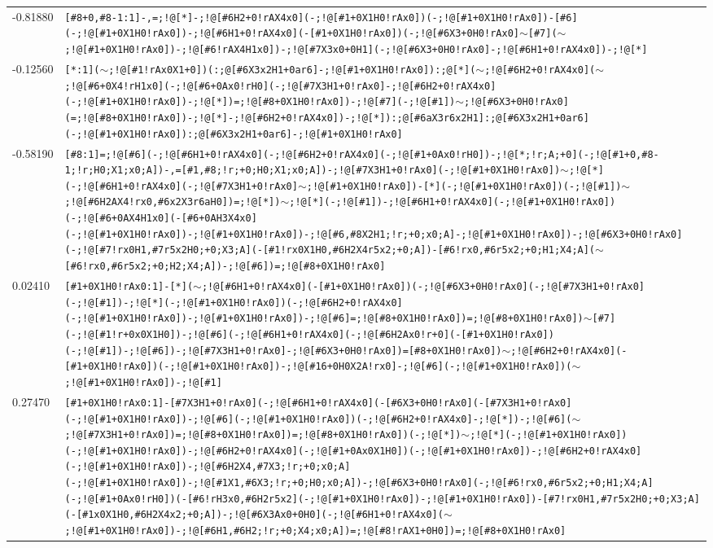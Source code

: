 \begin{longtable}{>{\baselineskip=10pt}p{} >{\baselineskip=10pt}p{}}
-0.81880 & \texttt{[\#8+0,\#8-1:1]-,=;!@[*]-;!@[\#6H2+0!rAX4x0](-;!@[\#1+0X1H0!rAx0])(-;!@[\#1+0X1H0!rAx0])-[\#6](-;!@[\#1+0X1H0!rAx0])-;!@[\#6H1+0!rAX4x0](-[\#1+0X1H0!rAx0])(-;!@[\#6X3+0H0!rAx0]$\sim$[\#7]($\sim$;!@[\#1+0X1H0!rAx0])-;!@[\#6!rAX4H1x0])-;!@[\#7X3x0+0H1](-;!@[\#6X3+0H0!rAx0]-;!@[\#6H1+0!rAX4x0])-;!@[*]} \\ 
-0.12560 & \texttt{[*:1]($\sim$;!@[\#1!rAx0X1+0])(:;@[\#6X3x2H1+0ar6]-;!@[\#1+0X1H0!rAx0]):;@[*]($\sim$;!@[\#6H2+0!rAX4x0]($\sim$;!@[\#6+0X4!rH1x0](-;!@[\#6+0Ax0!rH0](-;!@[\#7X3H1+0!rAx0]-;!@[\#6H2+0!rAX4x0](-;!@[\#1+0X1H0!rAx0])-;!@[*])=;!@[\#8+0X1H0!rAx0])-;!@[\#7](-;!@[\#1])$\sim$;!@[\#6X3+0H0!rAx0](=;!@[\#8+0X1H0!rAx0])-;!@[*]-;!@[\#6H2+0!rAX4x0])-;!@[*]):;@[\#6aX3r6x2H1]:;@[\#6X3x2H1+0ar6](-;!@[\#1+0X1H0!rAx0]):;@[\#6X3x2H1+0ar6]-;!@[\#1+0X1H0!rAx0]} \\ 
-0.58190 & \texttt{[\#8:1]=;!@[\#6](-;!@[\#6H1+0!rAX4x0](-;!@[\#6H2+0!rAX4x0](-;!@[\#1+0Ax0!rH0])-;!@[*;!r;A;+0](-;!@[\#1+0,\#8-1;!r;H0;X1;x0;A])-,=[\#1,\#8;!r;+0;H0;X1;x0;A])-;!@[\#7X3H1+0!rAx0](-;!@[\#1+0X1H0!rAx0])$\sim$;!@[*](-;!@[\#6H1+0!rAX4x0](-;!@[\#7X3H1+0!rAx0]$\sim$;!@[\#1+0X1H0!rAx0])-[*](-;!@[\#1+0X1H0!rAx0])(-;!@[\#1])$\sim$;!@[\#6H2AX4!rx0,\#6x2X3r6aH0])=;!@[*])$\sim$;!@[*](-;!@[\#1])-;!@[\#6H1+0!rAX4x0](-;!@[\#1+0X1H0!rAx0])(-;!@[\#6+0AX4H1x0](-[\#6+0AH3X4x0](-;!@[\#1+0X1H0!rAx0])-;!@[\#1+0X1H0!rAx0])-;!@[\#6,\#8X2H1;!r;+0;x0;A]-;!@[\#1+0X1H0!rAx0])-;!@[\#6X3+0H0!rAx0](-;!@[\#7!rx0H1,\#7r5x2H0;+0;X3;A](-[\#1!rx0X1H0,\#6H2X4r5x2;+0;A])-[\#6!rx0,\#6r5x2;+0;H1;X4;A]($\sim$[\#6!rx0,\#6r5x2;+0;H2;X4;A])-;!@[\#6])=;!@[\#8+0X1H0!rAx0]} \\ 
0.02410 & \texttt{[\#1+0X1H0!rAx0:1]-[*]($\sim$;!@[\#6H1+0!rAX4x0](-[\#1+0X1H0!rAx0])(-;!@[\#6X3+0H0!rAx0](-;!@[\#7X3H1+0!rAx0](-;!@[\#1])-;!@[*](-;!@[\#1+0X1H0!rAx0])(-;!@[\#6H2+0!rAX4x0](-;!@[\#1+0X1H0!rAx0])-;!@[\#1+0X1H0!rAx0])-;!@[\#6]=;!@[\#8+0X1H0!rAx0])=;!@[\#8+0X1H0!rAx0])$\sim$[\#7](-;!@[\#1!r+0x0X1H0])-;!@[\#6](-;!@[\#6H1+0!rAX4x0](-;!@[\#6H2Ax0!r+0](-[\#1+0X1H0!rAx0])(-;!@[\#1])-;!@[\#6])-;!@[\#7X3H1+0!rAx0]-;!@[\#6X3+0H0!rAx0])=[\#8+0X1H0!rAx0])$\sim$;!@[\#6H2+0!rAX4x0](-[\#1+0X1H0!rAx0])(-;!@[\#1+0X1H0!rAx0])-;!@[\#16+0H0X2A!rx0]-;!@[\#6](-;!@[\#1+0X1H0!rAx0])($\sim$;!@[\#1+0X1H0!rAx0])-;!@[\#1]} \\ 
0.27470 & \texttt{[\#1+0X1H0!rAx0:1]-[\#7X3H1+0!rAx0](-;!@[\#6H1+0!rAX4x0](-[\#6X3+0H0!rAx0](-[\#7X3H1+0!rAx0](-;!@[\#1+0X1H0!rAx0])-;!@[\#6](-;!@[\#1+0X1H0!rAx0])(-;!@[\#6H2+0!rAX4x0]-;!@[*])-;!@[\#6]($\sim$;!@[\#7X3H1+0!rAx0])=;!@[\#8+0X1H0!rAx0])=;!@[\#8+0X1H0!rAx0])(-;!@[*])$\sim$;!@[*](-;!@[\#1+0X1H0!rAx0])(-;!@[\#1+0X1H0!rAx0])-;!@[\#6H2+0!rAX4x0](-;!@[\#1+0Ax0X1H0])(-;!@[\#1+0X1H0!rAx0])-;!@[\#6H2+0!rAX4x0](-;!@[\#1+0X1H0!rAx0])-;!@[\#6H2X4,\#7X3;!r;+0;x0;A](-;!@[\#1+0X1H0!rAx0])-;!@[\#1X1,\#6X3;!r;+0;H0;x0;A])-;!@[\#6X3+0H0!rAx0](-;!@[\#6!rx0,\#6r5x2;+0;H1;X4;A](-;!@[\#1+0Ax0!rH0])(-[\#6!rH3x0,\#6H2r5x2](-;!@[\#1+0X1H0!rAx0])-;!@[\#1+0X1H0!rAx0])-[\#7!rx0H1,\#7r5x2H0;+0;X3;A](-[\#1x0X1H0,\#6H2X4x2;+0;A])-;!@[\#6X3Ax0+0H0](-;!@[\#6H1+0!rAX4x0]($\sim$;!@[\#1+0X1H0!rAx0])-;!@[\#6H1,\#6H2;!r;+0;X4;x0;A])=;!@[\#8!rAX1+0H0])=;!@[\#8+0X1H0!rAx0]} \\ 

\end{longtable}
